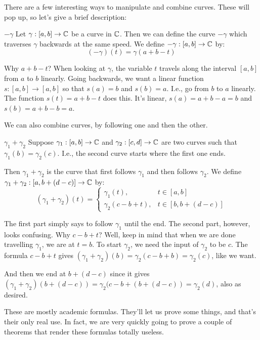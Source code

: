 There are a few interesting ways to manipulate and combine curves. These will pop up, so let's give a brief description:

\begin{defbo}{$-\gamma$}{} Let $\gamma:[a,b]\rightarrow \mathbb{C}$ be a curve in $\mathbb{C}$. Then we can define the curve $-\gamma$ which traverses $\gamma$ backwards at the same speed. We define $-\gamma:[a,b] \rightarrow \mathbb{C}$ by:
$$(-\gamma)(t) = \gamma(a + b - t)$$
\end{defbo}

Why $a + b - t$? When looking at $\gamma$, the variable $t$ travels along the interval $[a,b]$ from $a$ to $b$ linearly. Going backwards, we want a linear function $s:[a,b]\rightarrow [a,b]$ so that $s(a) = b$ and $s(b) = a$. I.e., go from $b$ to $a$ linearly. The function $s(t) = a + b - t$ does this. It's linear, $s(a) = a + b - a = b$ and $s(b) = a + b - b = a$.

We can also combine curves, by following one and then the other.

\begin{defbo}{$\gamma_1 + \gamma_2$}{} Suppose $\gamma_1:[a,b] \rightarrow \mathbb{C}$ and $\gamma_2:[c,d] \rightarrow \mathbb{C}$ are two curves such that $\gamma_1(b) = \gamma_2(c)$. I.e., the second curve starts where the first one ends.

Then $\gamma_1 + \gamma_2$ is the curve that first follows $\gamma_1$ and then follows $\gamma_2$. We define $\gamma_1 + \gamma_2:[a, b + (d-c)]\rightarrow \mathbb{C}$ by:
$$(\gamma_1 + \gamma_2)(t) = \begin{cases} \gamma_1(t), & t\in [a,b]\\
\gamma_2(c -b + t), & t\in [b,b + (d-c)]\end{cases}$$
\end{defbo}

The first part simply says to follow $\gamma_1$ until the end. The second part, however, looks confusing. Why $c-b + t$? Well, keep in mind that when we are done travelling $\gamma_1$, we are at $t = b$. To start $\gamma_2$, we need the input of $\gamma_2$ to be $c$. The formula $c-b + t$ gives $(\gamma_1 + \gamma_2)(b) = \gamma_2(c - b + b) = \gamma_2(c)$, like we want.

And then we end at $b + (d-c)$ since it gives $(\gamma_1 + \gamma_2)(b + (d-c)) = \gamma_2(c - b + (b +(d-c)) = \gamma_2(d)$, also as desired.

These are mostly academic formulas. They'll let us prove some things, and that's their only real use. In fact, we are very quickly going to prove a couple of theorems that render these formulas totally useless.

